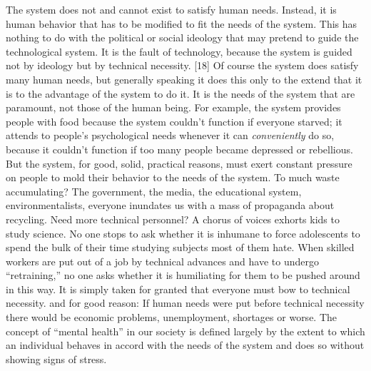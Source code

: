  The system does not and cannot exist to satisfy human needs. Instead, it is human behavior that has to be modified to fit the needs of the system. This has nothing to do with the political or social ideology that may pretend to guide the technological system. It is the fault of technology, because the system is guided not by ideology but by technical necessity. [18] Of course the system does satisfy many human needs, but generally speaking it does this only to the extend that it is to the advantage of the system to do it. It is the needs of the system that are paramount, not those of the human being. For example, the system provides people with food because the system couldn’t function if everyone starved; it attends to people’s psychological needs whenever it can {\em conveniently} do so, because it couldn’t function if too many people became depressed or rebellious. But the system, for good, solid, practical reasons, must exert constant pressure on people to mold their behavior to the needs of the system. To much waste accumulating? The government, the media, the educational system, environmentalists, everyone inundates us with a mass of propaganda about recycling. Need more technical personnel? A chorus of voices exhorts kids to study science. No one stops to ask whether it is inhumane to force adolescents to spend the bulk of their time studying subjects most of them hate. When skilled workers are put out of a job by technical advances and have to undergo “retraining,” no one asks whether it is humiliating for them to be pushed around in this way. It is simply taken for granted that everyone must bow to technical necessity. and for good reason: If human needs were put before technical necessity there would be economic problems, unemployment, shortages or worse. The concept of “mental health” in our society is defined largely by the extent to which an individual behaves in accord with the needs of the system and does so without showing signs of stress.

